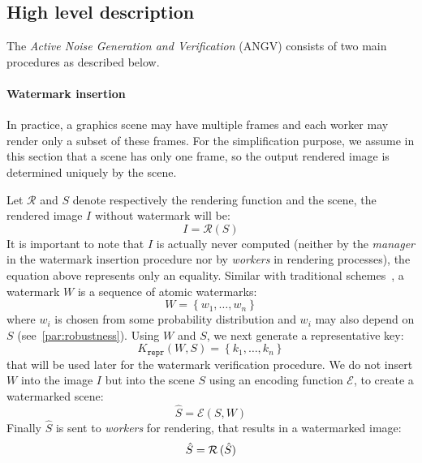 
\subsection[Hight level description]{High level description}
The \emph{Active Noise Generation and Verification} (ANGV) consists of two main procedures as described below.

\paragraph[Watermark insertion]{Watermark insertion}
In practice, a graphics scene may have multiple frames and each worker may render only a subset of these frames. For the simplification purpose, we assume in this section that a scene has only one frame, so the output rendered image is determined uniquely by the scene.

Let $\mathcal{R}$ and $S$ denote respectively the rendering function and the scene, the rendered image $I$ without watermark will be:
\begin{equation*}
    I = \mathcal{R} \left( S \right)
\end{equation*}
It is important to note that $I$ is actually never computed (neither by the \emph{manager} in the watermark insertion procedure nor by \emph{workers} in rendering processes), the equation above represents only an equality. Similar with traditional schemes~\cite{Cox1999,Cox1997,Craver1997}, a watermark $W$ is a sequence of atomic watermarks:
\begin{equation*}
    W = \left\{ w_1,\dots,w_n \right\}
\end{equation*}
where $w_i$ is chosen from some probability distribution and $w_i$ may also depend on $S$ (see~\autoref{par:robustness}). Using $W$ and $S$, we next generate a representative key:
\begin{equation*}
    K_{\mathtt{repr}} \left(W,S\right) = \left\{ k_1,\dots,k_n \right\}
\end{equation*}
that will be used later for the watermark verification procedure. We do not insert $W$ into the image $I$ but into the scene $S$ using an encoding function $\mathcal{E}$, to create a watermarked scene:
\begin{equation*}
    \hat{S} = \mathcal{E} \left(S, W\right)
\end{equation*}
Finally $\hat{S}$ is sent to \emph{workers} for rendering, that results in a watermarked image:
\begin{equation*}
    \hat{S} = \mathcal{R} \thinspace (\hat{S})
\end{equation*}

